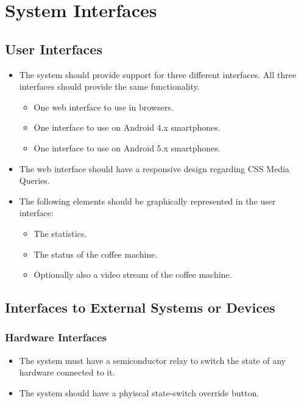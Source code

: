 \section{System Interfaces}

\subsection{User Interfaces}

\begin{itemize}
\item The system should provide support for three different interfaces. All three interfaces should provide the same functionality.
  \begin{itemize}
  \item One web interface to use in browsers.
  \item One interface to use on Android 4.x smartphones.
  \item One interface to use on Android 5.x smartphones.
  \end{itemize}

\item The web interface should have a responsive design regarding CSS Media Queries.

\item The following elements should be graphically represented in the user interface:
  \begin{itemize}
  \item The statistics.
  \item The status of the coffee machine.
  \item Optionally also a video stream of the coffee machine.
  \end{itemize}
\end{itemize}

\subsection{Interfaces to External Systems or Devices}

\subsubsection{Hardware Interfaces}

\begin{itemize}
\item The system must have a semiconductor relay to switch the state of any hardware connected to it.
\item The system should have a phyiscal state-switch override button.
\end{itemize}

